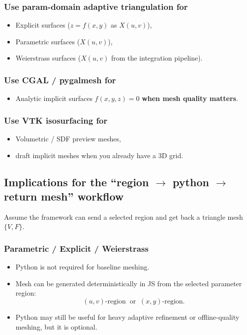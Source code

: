 \documentclass[12pt,a4paper]{article}
\theoremstyle{plain}
\theoremstyle{definition}
\begin{document}
	\subsubsection*{Use param-domain adaptive triangulation for}
	\begin{itemize}
		\item Explicit surfaces ($z=f(x,y)$ as $X(u,v)$),
		\item Parametric surfaces ($X(u,v)$),
		\item Weierstrass surfaces ($X(u,v)$ from the integration pipeline).
	\end{itemize}
	
	\subsubsection*{Use CGAL / pygalmesh for}
	\begin{itemize}
		\item Analytic implicit surfaces $f(x,y,z)=0$ \textbf{when mesh quality matters}.
	\end{itemize}
	
	\subsubsection*{Use VTK isosurfacing for}
	\begin{itemize}
		\item Volumetric / SDF preview meshes,
		\item draft implicit meshes when you already have a 3D grid.
	\end{itemize}
	
	\subsection{Implications for the ``region $\rightarrow$ python $\rightarrow$ return mesh'' workflow}
	Assume the framework can send a selected region and get back a triangle mesh $\{V,F\}$.
	
		\subsubsection*{Parametric / Explicit / Weierstrass}
	\begin{itemize}
		\item Python is not required for baseline meshing.
		\item Mesh can be generated deterministically in JS from the selected parameter region:
		\[
		(u,v)\text{-region} \;\;\text{or}\;\; (x,y)\text{-region}.
		\]
		\item Python may still be useful for heavy adaptive refinement or offline-quality meshing, but it is optional.
	\end{itemize}
	
\end{document}
